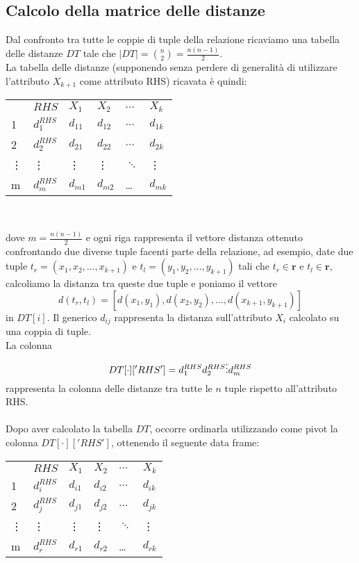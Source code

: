 \subsection{Calcolo della matrice delle distanze}
Dal confronto tra tutte le coppie di tuple della relazione ricaviamo una tabella delle distanze $DT$ tale che $|DT| = \binom{n}{2} = \frac{n(n-1)}{2}$.  \\ 
La tabella delle distanze (supponendo senza perdere di generalità di utilizzare l'attributo $X_{k+1}$ come attributo RHS) ricavata è quindi:
\begin{center}
	\begin{tabular}{l|l|llll}
		{} &  $RHS$ & $X_1$ &   $X_2$ &  $\ldots$ &   $X_k$ \\
		1 & $d^{RHS}_1$ & $d_{11}$ &  $d_{12}$ &  $\ldots$ &  $d_{1k}$ \\
		2 & $d^{RHS}_2$ & $d_{21}$ &  $d_{22}$ &  $\ldots$ &  $d_{2k}$ \\
		\vdots & \vdots & \vdots &  \vdots &  $\ddots$ &  \vdots \\
		m & $d^{RHS}_m$ &  $d_{m1}$ &  $d_{m2}$ &  \ldots &  $d_{mk}$ \\
	\end{tabular} \\
\end{center}
dove $m = \frac{n(n-1)}{2}$ e ogni riga rappresenta il vettore distanza ottenuto confrontando due diverse tuple facenti parte della relazione, ad esempio, date due tuple $t_r = (x_1, x_2, \ldots, x_{k+1})$ e $t_l = (y_1, y_2, \ldots, y_{k+1})$ tali che $t_r \in \mathbf{r}$ e $t_l \in \mathbf{r}$, calcoliamo la distanza tra queste due tuple e poniamo il vettore 
$$d(t_r,t_l) = [d(x_1, y_1), d(x_2, y_2), \ldots, d(x_{k+1}, y_{k+1})]$$
in $DT[i]$. Il generico $d_{ij}$ rappresenta la distanza sull'attributo $X_i$ calcolato su una coppia di tuple. \\
La colonna 
$$DT[\cdot]['RHS'] = {d_1^{RHS} \\ d_2^{RHS} \\ \vdots \\ d_m^{RHS}}$$
rappresenta la colonna delle distanze tra tutte le $n$ tuple rispetto all'attributo RHS. \\ \\
Dopo aver calcolato la tabella $DT$, occorre ordinarla utilizzando come pivot la colonna $DT[\cdot]['RHS']$, ottenendo il seguente data frame: \\
\begin{center}
	\begin{tabular}{l|l|llll}
		{} &  $RHS$ & $X_1$ &   $X_2$ &  $\ldots$ &   $X_k$ \\
		1 & $d^{RHS}_i$ & $d_{i1}$ &  $d_{i2}$ &  $\ldots$ &  $d_{ik}$ \\
		2 & $d^{RHS}_j$ & $d_{j1}$ &  $d_{j2}$ &  $\ldots$ &  $d_{jk}$ \\
		\vdots & \vdots & \vdots &  \vdots &  $\ddots$ &  \vdots \\
		m & $d^{RHS}_r$ &  $d_{r1}$ &  $d_{r2}$ &  \ldots &  $d_{rk}$ \\
	\end{tabular} \\
\end{center}
